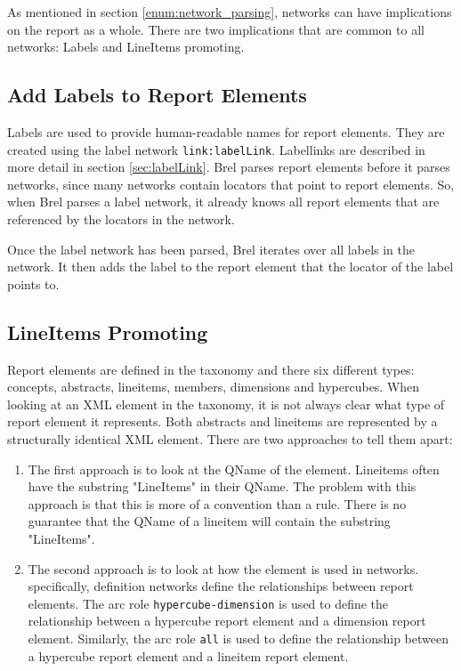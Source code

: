 As mentioned in section \ref{enum:network_parsing}, networks can have implications on the report as a whole.
There are two implications that are common to all networks: Labels and LineItems promoting.

\subsection{Add Labels to Report Elements}

Labels are used to provide human-readable names for report elements.
They are created using the label network \texttt{link:labelLink}.
Labellinks are described in more detail in section \ref{sec:labelLink}.
Brel parses report elements before it parses networks, since many networks contain locators that point to report elements.
So, when Brel parses a label network, it already knows all report elements that are referenced by the locators in the network.

Once the label network has been parsed, Brel iterates over all labels in the network.
It then adds the label to the report element that the locator of the label points to.

\subsection{LineItems Promoting}

Report elements are defined in the taxonomy and there six different types: concepts, abstracts, lineitems, members, dimensions and hypercubes.
When looking at an XML element in the taxonomy, it is not always clear what type of report element it represents.
Both abstracts and lineitems are represented by a structurally identical XML element.
There are two approaches to tell them apart: 

\begin{enumerate}
    \item The first approach is to look at the QName of the element.
    Lineitems often have the substring "LineItems" in their QName.
    The problem with this approach is that this is more of a convention than a rule.
    There is no guarantee that the QName of a lineitem will contain the substring "LineItems".
    \item The second approach is to look at how the element is used in networks.
    specifically, definition networks define the relationships between report elements.
    The arc role \texttt{hypercube-dimension} is used to define the relationship between a hypercube report element and a dimension report element.
    Similarly, the arc role \texttt{all} is used to define the relationship between a hypercube report element and a lineitem report element.
\end{enumerate}

